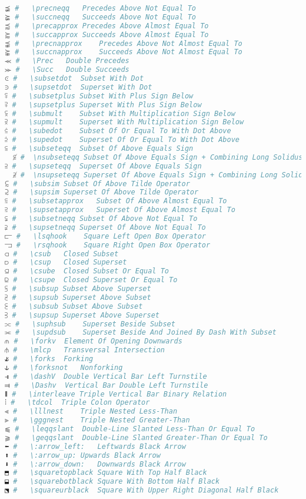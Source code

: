 \begin{lstlisting}[language=Julia, style=julia, linewidth=\textwidth]
⪵ #   \precneqq   Precedes Above Not Equal To
⪶ #   \succneqq   Succeeds Above Not Equal To
⪷ #   \precapprox Precedes Above Almost Equal To
⪸ #   \succapprox Succeeds Above Almost Equal To
⪹ #   \precnapprox    Precedes Above Not Almost Equal To
⪺ #   \succnapprox    Succeeds Above Not Almost Equal To
⪻ #   \Prec   Double Precedes
⪼ #   \Succ   Double Succeeds
⪽ #   \subsetdot  Subset With Dot
⪾ #   \supsetdot  Superset With Dot
⪿ #   \subsetplus Subset With Plus Sign Below
⫀ #   \supsetplus Superset With Plus Sign Below
⫁ #   \submult    Subset With Multiplication Sign Below
⫂ #   \supmult    Superset With Multiplication Sign Below
⫃ #   \subedot    Subset Of Or Equal To With Dot Above
⫄ #   \supedot    Superset Of Or Equal To With Dot Above
⫅ #   \subseteqq  Subset Of Above Equals Sign
  ⫅̸ #  \nsubseteqq Subset Of Above Equals Sign + Combining Long Solidus Overlay
⫆ #   \supseteqq  Superset Of Above Equals Sign
  ⫆̸ #  \nsupseteqq Superset Of Above Equals Sign + Combining Long Solidus Overlay
⫇ #   \subsim Subset Of Above Tilde Operator
⫈ #   \supsim Superset Of Above Tilde Operator
⫉ #   \subsetapprox   Subset Of Above Almost Equal To
⫊ #   \supsetapprox   Superset Of Above Almost Equal To
⫋ #   \subsetneqq Subset Of Above Not Equal To
⫌ #   \supsetneqq Superset Of Above Not Equal To
⫍ #   \lsqhook    Square Left Open Box Operator
⫎ #   \rsqhook    Square Right Open Box Operator
⫏ #   \csub   Closed Subset
⫐ #   \csup   Closed Superset
⫑ #   \csube  Closed Subset Or Equal To
⫒ #   \csupe  Closed Superset Or Equal To
⫓ #   \subsup Subset Above Superset
⫔ #   \supsub Superset Above Subset
⫕ #   \subsub Subset Above Subset
⫖ #   \supsup Superset Above Superset
⫗ #   \suphsub    Superset Beside Subset
⫘ #   \supdsub    Superset Beside And Joined By Dash With Subset
⫙ #   \forkv  Element Of Opening Downwards
⫛ #   \mlcp   Transversal Intersection
⫝̸ #   \forks  Forking
⫝ #   \forksnot   Nonforking
⫣ #   \dashV  Double Vertical Bar Left Turnstile
⫤ #   \Dashv  Vertical Bar Double Left Turnstile
⫴ #   \interleave Triple Vertical Bar Binary Relation
⫶ #   \tdcol  Triple Colon Operator
⫷ #   \lllnest    Triple Nested Less-Than
⫸ #   \gggnest    Triple Nested Greater-Than
⫹ #   \leqqslant  Double-Line Slanted Less-Than Or Equal To
⫺ #   \geqqslant  Double-Line Slanted Greater-Than Or Equal To
⬅ #   \:arrow_left:   Leftwards Black Arrow
⬆ #   \:arrow_up: Upwards Black Arrow
⬇ #   \:arrow_down:   Downwards Black Arrow
⬒ #   \squaretopblack Square With Top Half Black
⬓ #   \squarebotblack Square With Bottom Half Black
⬔ #   \squareurblack  Square With Upper Right Diagonal Half Black

\end{lstlisting}
